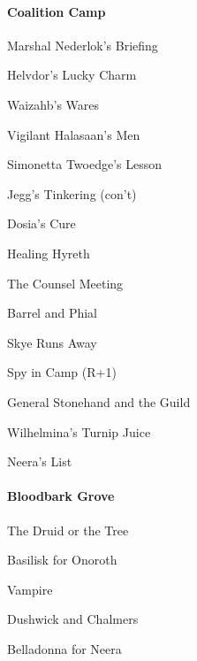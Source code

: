 \documentclass[10pt,a4,twoside]{book}
\begin{document}
\begin{multicols}{3}
\paragraph*{Coalition Camp}
\begin{trivlist}
\item Marshal Nederlok's Briefing
\item Helvdor's Lucky Charm %
\item Waizahb's Wares
\item Vigilant Halasaan's Men
\item Simonetta Twoedge's Lesson %
\item Jegg's Tinkering (con't)
\item Dosia's Cure
\item Healing Hyreth
\item The Counsel Meeting
\item Barrel and Phial
\item Skye Runs Away
\item Spy in Camp \textcolor{OliveGreen}{(R+1)}%
\item General Stonehand and the Guild
\item Wilhelmina's Turnip Juice
\item Neera's List %
\end{trivlist}

\paragraph*{Bloodbark Grove}
\begin{trivlist}
\item The Druid or the Tree %
\item Basilisk for Onoroth
\item Vampire
\item Dushwick and Chalmers
\item Belladonna for Neera %
\end{trivlist}


\end{multicols}
\end{document}
